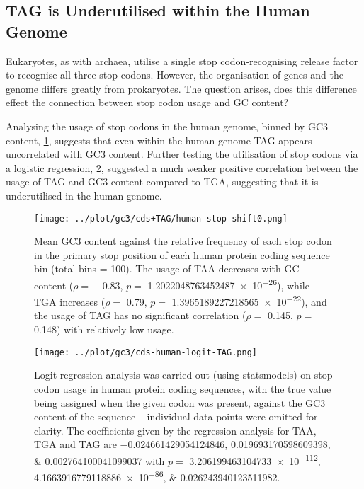 \documentclass[../main.tex]{subfile}
\begin{document}
    \subsection{TAG is Underutilised within the Human Genome}
        Eukaryotes, as with archaea, utilise a single stop codon-recognising release factor to recognise all three stop codons. However, the organisation of genes and the genome differs greatly from prokaryotes. The question arises, does this difference effect the connection between stop codon usage and GC content?

        Analysing the usage of stop codons in the human genome, binned by GC3 content, \cref{fig:results/stopUsage/human/protein}, suggests that even within the human genome TAG appears uncorrelated with GC3 content.
        Further testing the utilisation of stop codons via a logistic regression, \cref{fig:results/stopUsage/human/protein/logistic}, suggested a much weaker positive correlation between the usage of TAG and GC3 content compared to TGA, suggesting that it is underutilised in the human genome.

        \begin{figure}[H]
            \centering
            \texttt{[image: ../plot/gc3/cds+TAG/human-stop-shift0.png]}
            \caption{%
                Mean GC3 content against the relative frequency of each stop codon in the primary stop position of each human protein coding sequence bin (total bins = 100). The usage of TAA decreases with GC content ($\rho =$ \num{-0.83}, $p=$ \num[round-mode=figures, round-precision=2]{1.2022048763452487e-26}), while TGA increases ($\rho =$ \num{0.79}, $p=$ \num[round-mode=figures, round-precision=2]{1.3965189227218565e-22}), and the usage of TAG has no significant correlation ($\rho =$ \num{0.145}, $p=$ \num{0.148}) with relatively low usage.
            }
            \label{fig:results/stopUsage/human/protein}
        \end{figure}
        \begin{figure}[H]
            \centering
            \texttt{[image: ../plot/gc3/cds-human-logit-TAG.png]}
            \caption{%
                Logit regression analysis was carried out (using statsmodels) on stop codon usage in human protein coding sequences, with the true value being assigned when the given codon was present, against the GC3 content of the sequence -- individual data points were omitted for clarity.
                The coefficients given by the regression analysis for TAA, TGA and TAG are \numlist[round-mode=figures, round-precision=2]{-0.024661429054124846;0.019693170598609398;0.002764100041099037} with $p=$ \numlist[round-mode=figures, round-precision=2]{3.206199463104733e-112;4.1663916779118886e-86;0.026243940123511982}.
            }
            \label{fig:results/stopUsage/human/protein/logistic}
        \end{figure}
\end{document}
